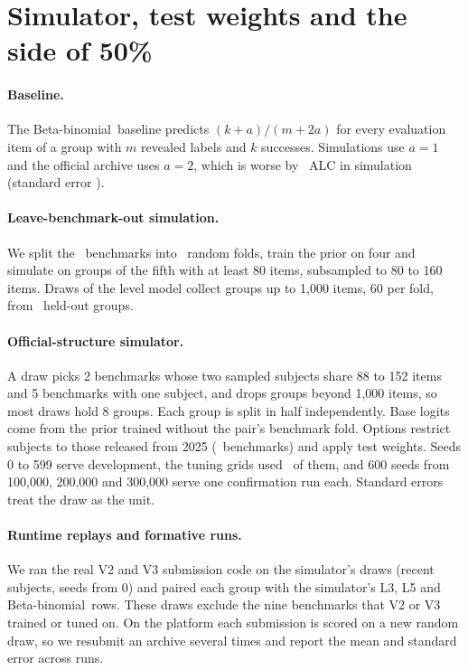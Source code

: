 \documentclass{article}
\newcommand{\BB}{Beta-binomial}
\begin{document}
\section{Simulator, test weights and the side of 50\%}
\label{app:sim}
\paragraph{Baseline.} The \BB\ baseline predicts $(k+a)/(m+2a)$ for every evaluation item of a group with $m$ revealed labels and $k$ successes. Simulations use $a=1$ and the official archive uses $a=2$, which is worse by \ConfBetaTwoAbs\ ALC in simulation (standard error \ConfBetaTwoSe).

\paragraph{Leave-benchmark-out simulation.} We split the \NBenchKept\ benchmarks into \LoboFolds\ random folds, train the prior on four and simulate on groups of the fifth with at least 80 items, subsampled to 80 to 160 items. Draws of the level model collect groups up to 1,000 items, 60 per fold, from \LoboGroups\ held-out groups.

\paragraph{Official-structure simulator.} A draw picks 2 benchmarks whose two sampled subjects share 88 to 152 items and 5 benchmarks with one subject, and drops groups beyond 1,000 items, so most draws hold 8 groups. Each group is split in half independently. Base logits come from the prior trained without the pair's benchmark fold. Options restrict subjects to those released from 2025 (\LadRDBench\ benchmarks) and apply test weights. Seeds 0 to 599 serve development, the tuning grids used \GridDraws\ of them, and 600 seeds from 100,000, 200,000 and 300,000 serve one confirmation run each. Standard errors treat the draw as the unit.

\paragraph{Runtime replays and formative runs.} We ran the real V2 and V3 submission code on the simulator's draws (recent subjects, seeds from 0) and paired each group with the simulator's L3, L5 and \BB\ rows. These draws exclude the nine benchmarks that V2 or V3 trained or tuned on. On the platform each submission is scored on a new random draw, so we resubmit an archive several times and report the mean and standard error across runs.
\end{document}
